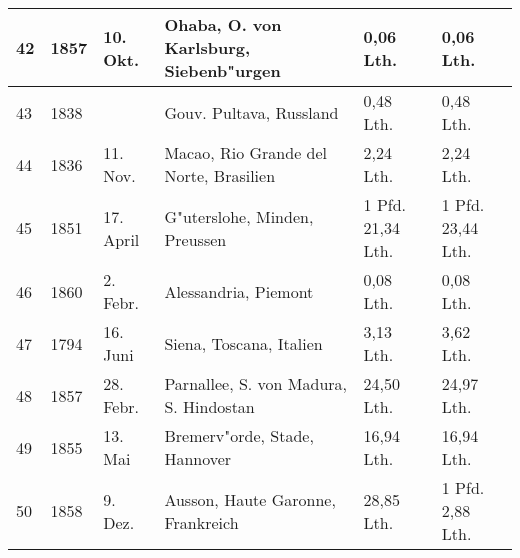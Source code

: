 \documentclass[a4paper, 11pt, oneside, german]{article}
\begin{document}
\begin{center}
\begin{footnotesize}
\begin{tabular}{ |p{7mm}|p{7mm}|p{13mm}|p{48mm}|p{22mm}|p{22mm}| }
    42 & 1857 & 10. Okt. & Ohaba, O. von Karlsburg, Siebenb"urgen & 0,06 Lth. & 0,06 Lth.\\\hline
    43 & 1838 &  & Gouv. Pultava, Russland & 0,48 Lth. & 0,48 Lth.\\\hline
    44 & 1836 & 11. Nov. & Macao, Rio Grande del Norte, Brasilien & 2,24 Lth. & 2,24 Lth.\\\hline
    45 & 1851 & 17. April & G"uterslohe, Minden, Preussen & 1 Pfd. 21,34 Lth. & 1 Pfd. 23,44 Lth.\\\hline
    46 & 1860 & 2. Febr. & Alessandria, Piemont & 0,08 Lth. & 0,08 Lth.\\\hline
    47 & 1794 & 16. Juni & Siena, Toscana, Italien & 3,13 Lth. & 3,62 Lth.\\\hline
    48 & 1857 & 28. Febr. & Parnallee, S. von Madura, S. Hindostan & 24,50 Lth. & 24,97 Lth.\\\hline
    49 & 1855 & 13. Mai & Bremerv"orde, Stade, Hannover & 16,94 Lth. & 16,94 Lth.\\\hline
    50 & 1858 & 9. Dez. & Ausson, Haute Garonne, Frankreich & 28,85 Lth. & 1 Pfd. 2,88 Lth.\\
    \hline
\end{tabular}
\end{footnotesize}
\end{center}
\end{document}
